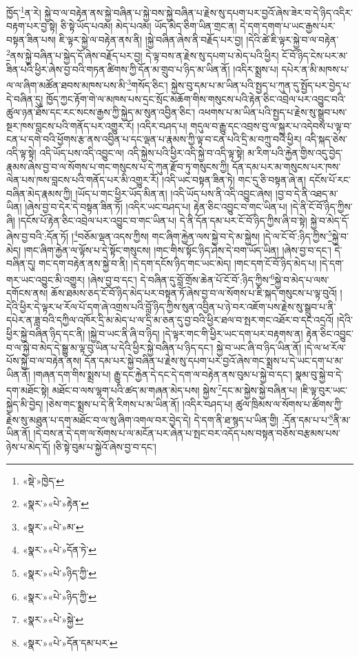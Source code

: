 ཁྱོད་\footnote{«སྡེ་»ཁྱེད་}ན་རེ། སྐྱེ་བ་ལ་བརྟེན་ནས་སྐྱེ་བཞིན་པ་སྐྱེ་བས་སྐྱེ་བཞིན་པ་རྗེས་སུ་དཔག་པར་བྱའོ་ཞེས་ཟེར་བ་དེ་ཉིད་འདིར་བརྟག་པར་བྱ་སྟེ། ཅི་སྟེ་ཡོད་པའམ། མེད་པའམ། ཡོད་མེད་ཅིག་ཡིན་གྲང་ན། དེ་དག་དགག་པ་ཡང་རྒྱས་པར་བསྟན་ཟིན་པས། ཇི་ལྟར་སྐྱེ་ལ་བརྟེན་ནས་ནི། །སྐྱེ་བཞིན་ཞེས་ནི་བརྗོད་པར་བྱ། །དེའི་ཚེ་ཇི་ལྟར་སྐྱེ་བ་ལ་བརྟེན་\footnote{«སྣར་»«པེ་»རྟེན་}ནས་སྐྱེ་བཞིན་པ་སྐྱེད་དོ་ཞེས་བརྗོད་པར་བྱ། དེ་ལྟ་བས་ན་རྗེས་སུ་དཔག་པ་མེད་པའི་ཕྱིར། ངོ་བོ་ཉིད་ངེས་པར་མ་ཟིན་པའི་ཕྱིར་ཞེས་བྱ་བའི་གཏན་ཚིགས་ཀྱི་དོན་མ་གྲུབ་པ་ཉིད་མ་ཡིན་ནོ། །འདིར་སྨྲས་པ། དཔེར་ན་མི་མཁས་པ་ལ་ལ་ཞིག་མཚོན་ཐབས་མཁས་པས་མི་\footnote{«སྣར་»«པེ་»མ་}གསོད་ཅིང་། སྐྱེས་བུ་དམ་པ་མ་ཡིན་པའི་སྤྱད་པ་ཀུན་དུ་སྤྱོད་པར་བྱེད་པ་དེ་བཞིན་དུ། ཁྱོད་ཀྱང་རྟོག་གེ་ལ་མཁས་པས་དྲང་སྲོང་མཆོག་གིས་གསུངས་པའི་རྟེན་ཅིང་འབྲེལ་པར་འབྱུང་བའི་ཚུལ་ཉན་ཐོས་དང་རང་སངས་རྒྱས་ཀྱི་སྐྱེད་མ་སུན་འབྱིན་ཅིང་། འཕགས་པ་མ་ཡིན་པའི་སྤྱད་པ་རྗེས་སུ་སྒྲུབ་པས་སྔར་ཁས་བླངས་པའི་གནོད་པར་འགྱུར་རོ། །འདིར་བཤད་པ། གདུལ་བ་རྒྱུ་དང་འབྲས་བུ་ལ་སྐུར་པ་འདེབས་པ་ལྟ་བ་ངན་པ་དགེ་བའི་ཕྱོགས་རྩ་ནས་འབྱིན་པ་དང་ལྡན་པ་རྣམས་ཀྱི་ལྟ་བ་ངན་པའི་དྲི་མ་བཀྲུ་བའི་ཕྱིར། འདི་སྐད་ཅེས་འདི་ལྟ་སྟེ། འདི་ཡོད་པས་འདི་འབྱུང་ལ། འདི་སྐྱེས་པའི་ཕྱིར་འདི་སྐྱེ་བ་འདི་ལྟ་སྟེ། མ་རིག་པའི་རྐྱེན་གྱིས་འདུ་བྱེད་རྣམས་ཞེས་བྱ་བ་ལ་སོགས་པ་གང་གསུངས་པ་དེ་ཀུན་རྫོབ་ཏུ་གསུངས་ཀྱི། དོན་དམ་པར་མ་གསུངས་པར་ཁས་ལེན་པས་ཁས་བླངས་པའི་གནོད་པར་མི་འགྱུར་རོ། །འདི་ཡང་བསྟན་ཟིན་ཏེ། གང་དུ་ཅི་བསྟན་ཞེ་ན། དངོས་པོ་རང་བཞིན་མེད་རྣམས་ཀྱི། །ཡོད་པ་གང་ཕྱིར་ཡོད་མིན་ན། །འདི་ཡོད་པས་ནི་འདི་འབྱུང་ཞེས། །བྱ་བ་དེ་ནི་འཐད་མ་ཡིན། །ཞེས་བྱ་བ་དེར་དེ་བསྟན་ཟིན་ཏོ། །འདིར་ཡང་བཤད་པ། རྟེན་ཅིང་འབྱུང་བ་གང་ཡིན་པ། །དེ་ནི་ངོ་བོ་ཉིད་ཀྱིས་ཞི། །དངོས་པོ་རྟེན་ཅིང་འབྲེལ་པར་འབྱུང་བ་གང་ཡིན་པ། དེ་ནི་དོན་དམ་པར་ངོ་བོ་ཉིད་ཀྱིས་ཞི་བ་སྟེ། སྐྱེ་བ་མེད་དོ་ཞེས་བྱ་བའི་:དོན་ཏོ། །\footnote{«སྣར་»«པེ་»དོན་ཏེ་}བཅོམ་ལྡན་འདས་ཀྱིས། གང་ཞིག་རྐྱེན་ལས་སྐྱེ་བ་དེ་མ་སྐྱེས། །དེ་ལ་ངོ་བོ་:ཉིད་ཀྱིས་\footnote{«སྣར་»«པེ་»ཉིད་ཀྱི་}སྐྱེ་བ་མེད། །གང་ཞིག་རྐྱེན་ལ་ལྟོས་པ་དེ་སྟོང་གསུངས། །གང་གིས་སྟོང་ཉིད་ཤེས་དེ་བག་ཡོད་ཡིན། །ཞེས་བྱ་བ་དང་། དེ་བཞིན་དུ། གང་དག་བརྟེན་ནས་སྐྱེ་བ་ནི། །དེ་དག་དངོས་ཉིད་གང་ཡང་མེད། །གང་དག་ངོ་བོ་ཉིད་མེད་པ། །དེ་དག་གར་ཡང་འབྱུང་མི་འགྱུར། །ཞེས་བྱ་བ་དང་། དེ་བཞིན་དུ་བློ་གྲོས་ཆེན་པོ་ངོ་བོ་:ཉིད་ཀྱིས་\footnote{«སྣར་»«པེ་»ཉིད་ཀྱི་}སྐྱེ་བ་མེད་པ་ལས་དགོངས་ནས། ཆོས་ཐམས་ཅད་ངོ་བོ་ཉིད་མེད་པར་བསྟན་ཏོ་ཞེས་བྱ་བ་ལ་སོགས་པ་ཇི་སྐད་གསུངས་པ་ལྟ་བུའོ། །དེའི་ཕྱིར་དེ་ལྟར་ཕ་རོལ་པོ་དག་ཞེ་འགྲས་པའི་བློ་ཉིད་ཀྱིས་སུན་འབྱིན་པ་ཉེ་བར་འཇོག་པས་རྗེས་སུ་སྒྲུབ་པ་ནི་དཔེར་ན་ཟླ་བའི་དཀྱིལ་འཁོར་དྲི་མ་མེད་པ་ལ་དྲི་མ་ཅན་དུ་བྱ་བའི་ཕྱིར་ཐལ་བ་སྤར་གང་འཐོར་བ་དང་འདྲའོ། །དེའི་ཕྱིར་སྐྱེ་བཞིན་ཉིད་དང་ནི། །སྐྱེ་བ་ཡང་ནི་ཞི་བ་ཉིད། །དེ་ལྟར་གང་གི་ཕྱིར་ཡང་དག་པར་བརྟགས་ན། རྟེན་ཅིང་འབྱུང་བ་ལ་སྐྱེ་བ་མེད་དེ་སྒྱུ་མ་ལྟ་བུ་ཡིན་པ་དེའི་ཕྱིར་སྐྱེ་བཞིན་པ་ཉིད་དང་། སྐྱེ་བ་ཡང་ཞི་བ་ཉིད་ཡིན་ནོ། །དེ་ལ་ཕ་རོལ་པོས་སྐྱེ་བ་ལ་བརྟེན་ནས། དོན་དམ་པར་སྐྱེ་བཞིན་པ་རྗེས་སུ་དཔག་པར་བྱའོ་ཞེས་གང་སྨྲས་པ་དེ་ཡང་དག་པ་མ་ཡིན་ནོ། །གཞན་དག་གིས་སྨྲས་པ། རྒྱུ་དང་རྐྱེན་དེ་དང་དེ་དག་ལ་བརྟེན་ནས་བུམ་པ་སྐྱེ་བ་དང་། སྣམ་བུ་སྐྱེ་བ་དེ་དག་མཐོང་སྟེ། མཐོང་བ་ལས་ལྷག་པའི་ཚད་མ་གཞན་མེད་པས། སྐྱེས་\footnote{«སྣར་»«པེ་»སྐྱེ་}དང་མ་སྐྱེས་སྐྱེ་བཞིན་པ། །ཇི་ལྟ་བུར་ཡང་སྐྱེད་མི་བྱེད། །ཅེས་གང་སྨྲས་པ་དེ་ནི་རིགས་པ་མ་ཡིན་ནོ། །འདིར་བཤད་པ། ཚུལ་ཁྲིམས་ལ་སོགས་པ་ཚོགས་ཀྱི་རྗེས་སུ་མཐུན་པ་དག་མཐོང་བ་ལ་སུ་ཞིག་འགལ་བར་བྱེད་དེ། དེ་དག་ནི་ཐ་སྙད་པ་ཡིན་གྱི། :དོན་དམ་པ་པ་\footnote{«སྣར་»«པེ་»དོན་དམ་པར་}ནི་མ་ཡིན་ནོ། །དེ་བས་ན་དེ་དག་ལ་སོགས་པ་ལ་མངོན་པར་ཞེན་པ་སྤང་བར་འདོད་པས་བསྟན་བཅོས་བརྩམས་པས་ཉེས་པ་མེད་དོ། །ཅི་སྟེ་བུམ་པ་སྐྱེའོ་ཞེས་བྱ་བ་དང་། 